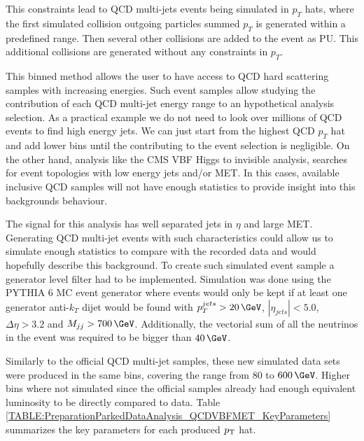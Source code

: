 This constraints lead to \gls{QCD} multi-jets events being simulated in $p_T$ hats, where the first simulated collision outgoing particles summed $p_T$ is generated within a predefined range. Then several other collisions are added to the event as \gls{PU}. This additional collisions are generated without any constraints in $p_T$. 

This binned method allows the user to have access to \gls{QCD} hard scattering samples with increasing energies. Such event samples allow studying the contribution of each \gls{QCD} multi-jet energy range to an hypothetical analysis selection. As a practical example we do not need to look over millions of \gls{QCD} events to find high energy jets. We can just start from the highest \gls{QCD} $p_T$ hat and add lower bins until the contributing to the event selection is negligible. On the other hand, analysis like the \gls{CMS} \gls{VBF} Higgs to invisible analysis, searches for event topologies with low energy jets and/or \gls{MET}. In this cases, available inclusive \gls{QCD} samples will not have enough statistics to provide insight into this backgrounds behaviour.

The signal for this analysis has well separated jets in $\eta$ and large \gls{MET}. Generating \gls{QCD} multi-jet events with such characteristics could allow us to simulate enough statistics to compare with the recorded data and would hopefully describe this background. To create such simulated event sample a generator level filter had to be implemented. Simulation was done using the \textsc{PYTHIA 6} \gls{MC} event generator where events would only be kept if at least one generator anti-$k_T$ dijet would be found with $p_T^{jets}>20\,\GeV$, $|\eta_{jets}|<5.0$, $\Delta\eta>3.2$ and $M_{jj}>700\,\GeV$. Additionally, the vectorial sum of all the neutrinos in the event was required to be bigger than $40\,\GeV$. 

Similarly to the official \gls{QCD} multi-jet samples, these new simulated data sets were produced in the same bins, covering the \pt range from 80 to $600\,\GeV$. Higher \pt bins where not simulated since the official samples already had enough equivalent luminosity to be directly compared to data. Table \ref{TABLE:PreparationParkedDataAnalysis_QCDVBFMET_KeyParameters} summarizes the key parameters for each produced $p_{\mathrm{T}}$ hat.

